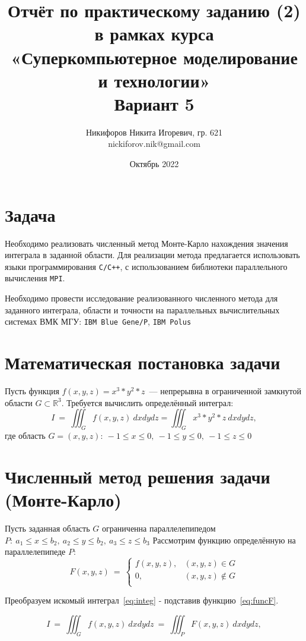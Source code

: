 \documentclass{article}
\title{Отчёт по практическому заданию (2) в рамках курса\\«Суперкомпьютерное моделирование и технологии»\\Вариант 5}
\author{Никифоров Никита Игоревич, гр. 621\\nickiforov.nik@gmail.com}
\date{Октябрь 2022}
\begin{document}
\maketitle
\newpage
\section{Задача}
    Необходимо реализовать численный метод Монте-Карло нахождения значения интеграла
    в заданной области. Для реализации метода предлагается использовать языки программирования 
    {\tt C/C++}, с использованием библиотеки параллельного вычисления {\tt MPI}.

    Необходимо провести исследование реализованного численного метода для
    заданного интеграла, области и точности 
    на параллельных вычислительных системах ВМК МГУ: {\tt IBM Blue Gene/P}, {\tt IBM Polus}
\section{Математическая постановка задачи}
    Пусть функция \(f(x, y, z) = x^3*y^2*z\)~--- непрерывна в ограниченной замкнутой области \(G \subset \mathbb{R}^3\).
    Требуется вычислить определённый интеграл:
    \begin{equation}
        I\ =\ \iiint_G f(x, y, z)\ dxdydz = \iiint_G x^3*y^2*z\ dxdydz,
        \label{eq:integ}
    \end{equation}
    где область \(G={(x,y,z):\ −1 \leq x \leq 0,\ −1\leq y \leq 0,\ −1\leq z \leq 0}\)
\section{Численный метод решения задачи (Монте-Карло)}
    Пусть заданная область \(G\) ограниченна параллелепипедом \(P:\ a_1 \leq x \leq b_2,\ a_2 \leq y \leq b_2,\ a_3 \leq z \leq b_3\)
    Рассмотрим функцию определённую на параллелепипеде \(P\):
    \begin{equation}
        F(x, y, z)\ =\
        \begin{cases}
            f(x, y, z), & (x, y, z) \in G\\
            0         , & (x, y, z) \notin G\\
        \end{cases}
        \label{eq:funcF}
    \end{equation}

    Преобразуем искомый интеграл~\ref{eq:integ} - подставив функцию~\ref{eq:funcF}.
    
    \begin{equation}
        I\ =\ \iiint_G f(x, y, z)\ dxdydz\ =\ \iiint_P F(x, y, z)\ dxdydz,
        \label{eq:integF}
    \end{equation}
\end{document}
